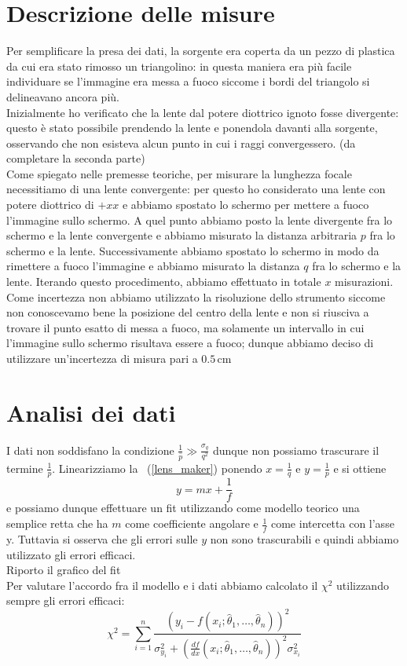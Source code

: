 \documentclass{article}
\begin{document}
	\section{Descrizione delle misure}
	Per semplificare la presa dei dati, la sorgente era coperta da un pezzo di plastica da cui era stato rimosso un triangolino: in questa maniera era più facile individuare se l'immagine era messa a fuoco siccome i bordi del triangolo si delineavano ancora più. \\
	Inizialmente ho verificato che la lente dal potere diottrico ignoto fosse divergente: questo è stato possibile prendendo la lente e ponendola davanti alla sorgente, osservando che non esisteva alcun punto in cui i raggi convergessero. (da completare la seconda parte) \\
	Come spiegato nelle premesse teoriche, per misurare la lunghezza focale necessitiamo di una lente convergente: per questo ho considerato una lente con potere diottrico di $+xx$ e abbiamo spostato lo schermo per mettere a fuoco l'immagine sullo schermo. A quel punto abbiamo posto la lente divergente fra lo schermo e la lente convergente e abbiamo misurato la distanza arbitraria $p$ fra lo schermo e la lente. Successivamente abbiamo spostato lo schermo in modo da rimettere a fuoco l'immagine e abbiamo misurato la distanza $q$ fra lo schermo e la lente. Iterando questo procedimento, abbiamo effettuato in totale $x$ misurazioni. \\
	Come incertezza non abbiamo utilizzato la risoluzione dello strumento siccome non conoscevamo bene la posizione del centro della lente e non si riusciva a trovare il punto esatto di messa a fuoco, ma solamente un intervallo in cui l'immagine sullo schermo risultava essere a fuoco; dunque abbiamo deciso di utilizzare un'incertezza di misura pari a $0.5 \, \si{\centi\meter}$
	\section{Analisi dei dati}
	I dati non soddisfano la condizione $\frac{1}{\hat{p}} \gg \frac{\sigma_q}{q^2}$ dunque non possiamo trascurare il termine $\frac{1}{p}$. Linearizziamo la ~(\ref{lens_maker}) ponendo $x = \frac{1}{q}$ e $y=\frac{1}{p}$ e si ottiene
	$$
		y = mx + \frac{1}{f}
	$$
	e possiamo dunque effettuare un fit utilizzando come modello teorico una semplice retta che ha $m$ come coefficiente angolare e $\frac{1}{f}$ come intercetta con l'asse y. Tuttavia si osserva che gli errori sulle $y$ non sono trascurabili e quindi abbiamo utilizzato gli errori efficaci. \\
	Riporto il grafico del fit \\
	
	Per valutare l'accordo fra il modello e i dati abbiamo calcolato il $\chi^2$ utilizzando sempre gli errori efficaci:
	\begin{equation}
		\chi^2 = \sum_{i=1}^n \frac{(y_i - f(x_i; \hat{\theta}_1, \ldots, \hat{\theta}_n))^2}{\sigma_{y_i}^2 + (\frac{df}{dx}(x_i; \hat{\theta}_1, \ldots, \hat{\theta}_n))^2 \sigma_{x_i}^2}
	\end{equation}
\end{document}
